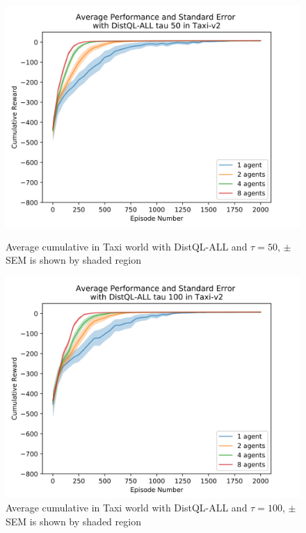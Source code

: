 \documentclass[jair,twoside,11pt,theapa]{article}
\begin{document}
\begin{figure}[h]
	\centering
	\begin{minipage}{.4\textwidth}
		\centering
		\includegraphics[width=1\linewidth]{resultImages/binned-Average-Performance-and-Standard-Error-with-DistQL-ALL-tau-50-in-Taxi-v2}
		\caption{Average cumulative in Taxi world with DistQL-ALL and $\tau=50$, $\pm$ SEM is shown by shaded region}
		\label{fig:DistQL-ALL-tau-50-env-Taxi}
	\end{minipage}
	\begin{minipage}{.4\textwidth}
		\centering
		\includegraphics[width=1\linewidth]{resultImages/binned-Average-Performance-and-Standard-Error-with-DistQL-ALL-tau-100-in-Taxi-v2}
		\caption{Average cumulative in Taxi world with DistQL-ALL and $\tau=100$, $\pm$ SEM is shown by shaded region}
		\label{fig:DistQL-ALL-tau-100-env-Taxi}
	\end{minipage}
\end{figure}%
\end{document}

